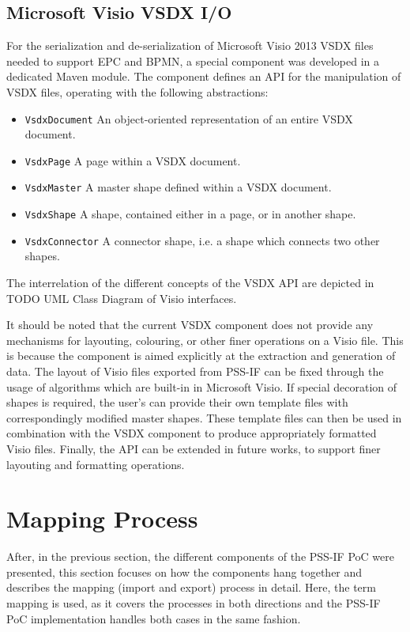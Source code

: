 \subsection{Microsoft Visio VSDX I/O}

For the serialization and de-serialization of Microsoft Visio 2013 VSDX files needed to support EPC and BPMN, a special component was developed in a dedicated Maven module. The component defines an API for the manipulation of VSDX files, operating with the following abstractions:

\begin{itemize}
\item \texttt{VsdxDocument} An object-oriented representation of an entire VSDX document.
\item \texttt{VsdxPage} A page within a VSDX document.
\item \texttt{VsdxMaster} A master shape defined within a VSDX document.
\item \texttt{VsdxShape} A shape, contained either in a page, or in another shape.
\item \texttt{VsdxConnector} A connector shape, i.e. a shape which connects two other shapes.
\end{itemize}

The interrelation of the different concepts of the VSDX API are depicted in \color{red} TODO UML Class Diagram of Visio interfaces\color{black}.

It should be noted that the current VSDX component does not provide any mechanisms for layouting, colouring, or other finer operations on a Visio file. This is because the component is aimed explicitly at the extraction and generation of data. The layout of Visio files exported from PSS-IF can be fixed through the usage of algorithms which are built-in in Microsoft Visio. If special decoration of shapes is required, the user's can provide their own template files with correspondingly modified master shapes. These template files can then be used in combination with the VSDX component to produce appropriately formatted Visio files. Finally, the API can be extended in future works, to support finer layouting and formatting operations.

\section{Mapping Process}
\label{sec:impl:process}

After, in the previous section, the different components of the PSS-IF PoC were presented, this section focuses on how the components hang together and describes the mapping (import and export) process in detail. Here, the term mapping is used, as it covers the processes in both directions and the PSS-IF PoC implementation handles both cases in the same fashion.

